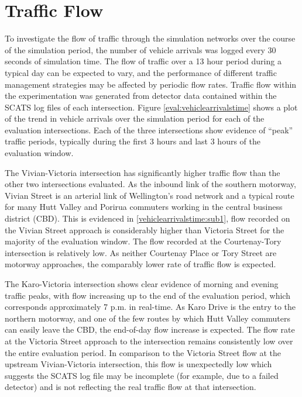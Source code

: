 \section{Traffic Flow}
\label{sec:trafficflow}

To investigate the flow of traffic through the simulation networks over the course of the simulation period, the number of vehicle arrivals was logged every 30 seconds of simulation time. The flow of traffic over a 13 hour period during a typical day can be expected to vary, and the performance of different traffic management strategies may be affected by periodic flow rates. Traffic flow within the experimentation was generated from detector data contained within the SCATS log files of each intersection. Figure \ref{eval:vehiclearrivalstime} shows a plot of the trend in vehicle arrivals over the simulation period for each of the evaluation intersections. Each of the three intersections show evidence of ``peak'' traffic periods, typically during the first 3 hours and last 3 hours of the evaluation window.

The Vivian-Victoria intersection has significantly higher traffic flow than the other two intersections evaluated. As the inbound link of the southern motorway, Vivian Street is an arterial link of Wellington's road network and a typical route for many Hutt Valley and Porirua commuters working in the central business district (CBD). This is evidenced in \ref{vehiclearrivalstime:sub1}, flow recorded on the Vivian Street approach is considerably higher than Victoria Street for the majority of the evaluation window. The flow recorded at the Courtenay-Tory intersection is relatively low. As neither Courtenay Place or Tory Street are motorway approaches, the comparably lower rate of traffic flow is expected. 

The Karo-Victoria intersection shows clear evidence of morning and evening traffic peaks, with flow increasing up to the end of the evaluation period, which corresponds approximately 7 p.m. in real-time. As Karo Drive is the entry to the northern motorway, and one of the few routes by which Hutt Valley commuters can easily leave the CBD, the end-of-day flow increase is expected. The flow rate at the Victoria Street approach to the intersection remains consistently low over the entire evaluation period. In comparison to the Victoria Street flow at the upstream Vivian-Victoria intersection, this flow is unexpectedly low which suggests the SCATS log file may be incomplete (for example, due to a failed detector) and is not reflecting the real traffic flow at that intersection. 

